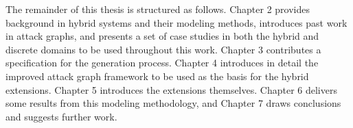 The remainder of this thesis is structured as follows. Chapter 2 provides background in hybrid systems
and their modeling methods, introduces past work in attack graphs, and presents a set of case studies
in both the hybrid and discrete domains to be used throughout this work. Chapter 3
contributes a specification for the generation process. Chapter 4 introduces in detail
the improved attack graph framework to be used as the basis for the hybrid extensions. Chapter 5
introduces the extensions themselves. Chapter 6 delivers some results from this modeling methodology,
and Chapter 7 draws conclusions and suggests further work.